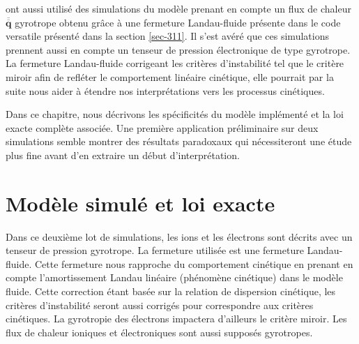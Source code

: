 \cite{ferrand_fluid_2021} ont aussi utilisé des simulations du modèle  prenant en compte un flux de chaleur $\overline{\overline{\boldsymbol{q}}}$ gyrotrope obtenu grâce à une fermeture Landau-fluide présente dans le code versatile présenté dans la section \ref{sec-311}. Il s'est avéré que ces simulations prennent aussi en compte un tenseur de pression électronique de type gyrotrope.
La fermeture Landau-fluide corrigeant les critères d'instabilité tel que le critère miroir afin de refléter le comportement linéaire cinétique, elle pourrait par la suite nous aider à étendre nos interprétations vers les processus cinétiques. 

Dans ce chapitre, nous décrivons les spécificités du modèle implémenté et la loi exacte complète associée. Une première application préliminaire sur deux simulations semble montrer des résultats paradoxaux qui nécessiteront une étude plus fine avant d'en extraire un début d'interprétation. 


\section{Modèle simulé et loi exacte}
\label{sec-341}

Dans ce deuxième lot de simulations, les ions et les électrons sont décrits avec un tenseur de pression gyrotrope. La fermeture utilisée est une fermeture Landau-fluide. Cette fermeture nous rapproche du comportement cinétique en prenant en compte l'amortissement Landau linéaire (phénomène cinétique) dans le modèle fluide. Cette correction étant basée sur la relation de dispersion cinétique, les critères d'instabilité seront aussi corrigés pour correspondre aux critères cinétiques. La gyrotropie des électrons impactera d'ailleurs le critère miroir. Les flux de chaleur ioniques et électroniques sont aussi supposés gyrotropes.

